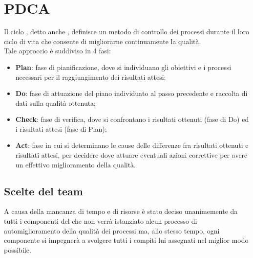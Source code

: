 \section{PDCA}
Il ciclo , detto anche , definisce un metodo di controllo dei processi durante il loro ciclo di vita che consente di migliorarne continuamente la qualità. \\
Tale approccio è suddiviso in 4 fasi:
\begin{itemize}
\item \textbf{Plan}: fase di pianificazione, dove si individuano gli obiettivi e i processi necessari per il raggiungimento dei risultati attesi;
\item \textbf{Do}: fase di attuazione del piano individuato al passo precedente e raccolta di dati sulla qualità ottenuta;
\item \textbf{Check}: fase di verifica, dove si confrontano i risultati ottenuti (fase di Do) ed i risultati attesi (fase di Plan);
\item \textbf{Act}: fase in cui si determinano le cause delle differenze fra risultati ottenuti e risultati attesi, per decidere dove attuare eventuali azioni correttive per avere un effettivo miglioramento della qualità.
\end{itemize}

\subsection{Scelte del team}
A causa della mancanza di tempo e di risorse è stato deciso unanimemente da tutti i componenti del  che non verrà istanziato alcun processo di automiglioramento della qualità dei processi ma, allo stesso tempo, ogni componente si impegnerà a svolgere tutti i compiti lui assegnati nel miglior modo possibile.

\newpage
